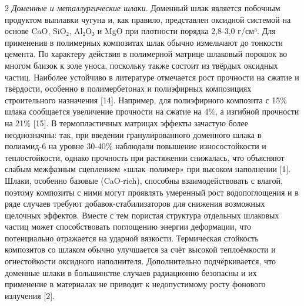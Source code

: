 \begin{multicols}{2}
\emph{Доменные и металлургические шлаки}. Доменный шлак
является побочным продуктом выплавки чугуна и, как правило, представлен
оксидной системой на основе CaO, SiO₂, Al₂O₃ и MgO при плотности порядка
2,8-3,0 г/см³. Для применения в полимерных композитах шлак обычно
измельчают до тонкости цемента. По характеру действия в полимерной
матрице шлаковый порошок во многом близок к золе уноса, поскольку также
состоит из твёрдых оксидных частиц. Наиболее устойчиво в литературе
отмечается рост прочности на сжатие и твёрдости, особенно в
полимербетонах и полиэфирных композициях строительного назначения
{[}14{]}. Например, для полиэфирного композита с 15\% шлака сообщается
увеличение прочности на сжатие на 4\%, а изгибной прочности на 21\%
{[}15{]}. В термопластичных матрицах эффекты зачастую более
неоднозначны: так, при введении гранулированного доменного шлака в
полиамид-6 на уровне 30-40\% наблюдали повышение износостойкости и
теплостойкости, однако прочность при растяжении снижалась, что объясняют
слабым межфазным сцеплением «шлак--полимер» при высоком наполнении
{[}1{]}. Шлаки, особенно базовые (CaO-rich), способны взаимодействовать
с влагой, поэтому композиты с ними могут проявлять умеренный рост
водопоглощения и в ряде случаев требуют добавок-стабилизаторов для
снижения возможных щелочных эффектов. Вместе с тем пористая структура
отдельных шлаковых частиц может способствовать поглощению энергии
деформации, что потенциально отражается на ударной вязкости. Термическая
стойкость композитов со шлаком обычно улучшается за счёт высокой
теплоёмкости и огнестойкости оксидного наполнителя. Дополнительно
подчёркивается, что доменные шлаки в большинстве случаев радиационно
безопасны и их применение в материалах не приводит к недопустимому росту
фонового излучения {[}2{]}.


\end{multicols}
